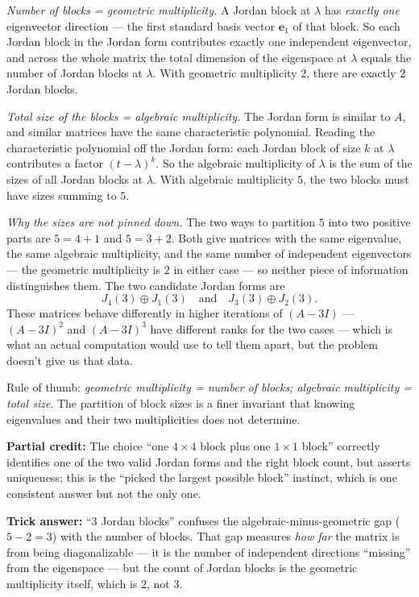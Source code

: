 \documentclass[12pt]{amsart}
\begin{document}
\emph{Number of blocks = geometric multiplicity.} A Jordan block at $\lambda$
has \emph{exactly one} eigenvector direction --- the first standard basis
vector $\mathbf{e}_1$ of that block. So each Jordan block in the Jordan
form contributes exactly one independent eigenvector, and across the whole
matrix the total dimension of the eigenspace at $\lambda$ equals the number
of Jordan blocks at $\lambda$. With geometric multiplicity $2$, there are
exactly $2$ Jordan blocks.

\emph{Total size of the blocks = algebraic multiplicity.} The Jordan form is
similar to $A$, and similar matrices have the same characteristic polynomial.
Reading the characteristic polynomial off the Jordan form: each Jordan block
of size $k$ at $\lambda$ contributes a factor $(t - \lambda)^k$. So the
algebraic multiplicity of $\lambda$ is the sum of the sizes of all Jordan
blocks at $\lambda$. With algebraic multiplicity $5$, the two blocks must
have sizes summing to $5$.

\emph{Why the sizes are not pinned down.} The two ways to partition $5$
into two positive parts are $5 = 4+1$ and $5 = 3+2$. Both give matrices with
the same eigenvalue, the same algebraic multiplicity, and the same number
of independent eigenvectors --- the geometric multiplicity is $2$ in either
case --- so neither piece of information distinguishes them. The two
candidate Jordan forms are
\[
J_4(3) \oplus J_1(3) \quad \text{and} \quad J_3(3) \oplus J_2(3).
\]
These matrices behave differently in higher iterations of $(A - 3I)$ ---
$(A - 3I)^2$ and $(A - 3I)^3$ have different ranks for the two cases ---
which is what an actual computation would use to tell them apart, but the
problem doesn't give us that data.

Rule of thumb: \emph{geometric multiplicity = number of blocks; algebraic
multiplicity = total size}. The partition of block sizes is a finer
invariant that knowing eigenvalues and their two multiplicities does not
determine.

\textbf{Partial credit:}
The choice ``one $4 \times 4$ block plus one $1 \times 1$ block'' correctly
identifies one of the two valid Jordan forms and the right block count,
but asserts uniqueness; this is the ``picked the largest possible block''
instinct, which is one consistent answer but not the only one.

\textbf{Trick answer:}
``$3$ Jordan blocks'' confuses the algebraic-minus-geometric gap
($5 - 2 = 3$) with the number of blocks. That gap measures \emph{how far}
the matrix is from being diagonalizable --- it is the number of independent
directions ``missing'' from the eigenspace --- but the count of Jordan
blocks is the geometric multiplicity itself, which is $2$, not $3$.
\end{document}

